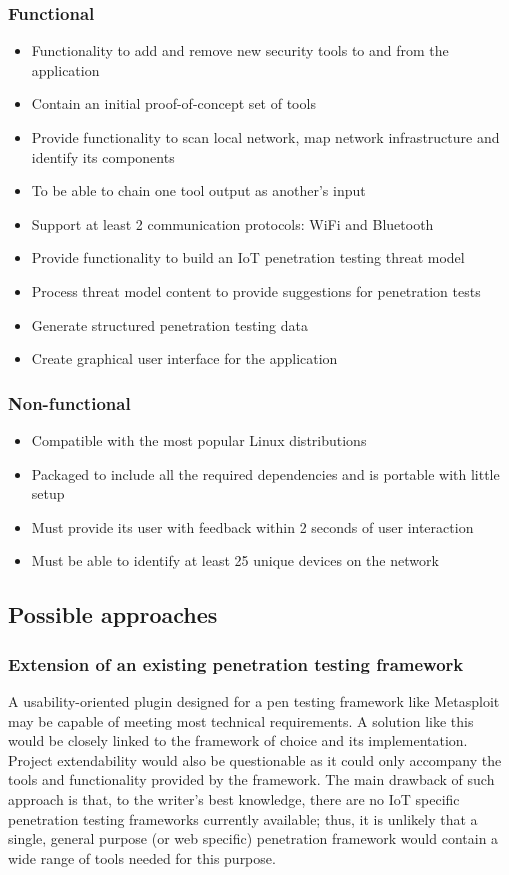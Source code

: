 	\subsubsection{Functional}
	\begin{itemize}
		\item Functionality to add and remove new security tools to and from the application
		\item Contain an initial proof-of-concept set of tools
		\item Provide functionality to scan local network, map network infrastructure and identify its components
		\item To be able to chain one tool output as another's input
		\item Support at least 2 communication protocols: WiFi and Bluetooth
		\item Provide functionality to build an IoT penetration testing threat model
		\item Process threat model content to provide suggestions for penetration tests
		\item Generate structured penetration testing data
		\item Create graphical user interface for the application
	\end{itemize}
	
	\subsubsection{Non-functional}
	\begin{itemize}
		\item Compatible with the most popular Linux distributions
		\item Packaged to include all the required dependencies and is portable with little setup
		\item Must provide its user with feedback within 2 seconds of user interaction
		\item Must be able to identify at least 25 unique devices on the network
	\end{itemize}


\subsection{Possible approaches}
	\subsubsection{Extension of an existing penetration testing framework}
	A usability-oriented plugin designed for a pen testing framework like Metasploit may be capable of meeting most technical requirements. A solution like this would be closely linked to the framework of choice and its implementation. Project extendability would also be questionable as it could only accompany the tools and functionality provided by the framework. The main drawback of such approach is that, to the writer’s best knowledge, there are no IoT specific penetration testing frameworks currently available; thus, it is unlikely that a single, general purpose (or web specific) penetration framework would contain a wide range of tools needed for this purpose.
	
